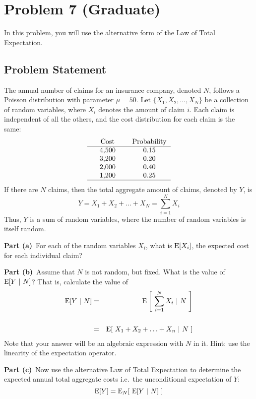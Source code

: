 \documentclass[12pt]{article}
\theoremstyle{definition}
\begin{document}
\newpage
\section*{Problem 7 (Graduate)}

In this problem, you will use the alternative form of the Law of Total Expectation.

\subsection*{Problem Statement}

The annual number of claims for an insurance company, denoted $N$, follows a Poisson distribution with parameter $\mu = 50$. Let $\{X_1, X_2, \ldots, X_N\}$ be a collection of random variables, where $X_i$ denotes the amount of claim $i$. Each claim is independent of all the others, and the cost distribution for each claim is the same:
$$
\begin{tabular}{ccccc}
& Cost & & Probability\\
\hline
& 4,500 & & 0.15\\
& 3,200 & & 0.20\\
& 2,000 & & 0.40\\
& 1,200 & & 0.25\\
\hline
\end{tabular}
$$
If there are $N$ claims, then the total aggregate amount of claims, denoted by $Y$, is
$$
Y = X_1 + X_2 + \ldots + X_N = \sum_{i=1}^N X_i
$$
Thus, $Y$ is a sum of random variables, where the number of random variables is itself random.

\bigskip
\noindent
{\bf Part (a)}\ For each of the random variables $X_i$, what is $\hbox{E}[X_i]$, the expected cost for each individual claim?

\bigskip
\noindent
{\bf Part (b)}\ Assume that $N$ is not random, but fixed. What is the value of $\hbox{E}[Y\ |\ N]$? That is, calculate the value of 
\begin{eqnarray*}
\hbox{E}[ Y\ |\ N] & = & \hbox{E} \left [\ \sum_{i=1}^N X_i\ |\ N\ \right ]\\
\\
& = & \hbox{E}[\ X_1 + X_2 + \ldots + X_n\ |\ N\ ]
\end{eqnarray*}
Note that your answer will be an algebraic expression with $N$ in it. Hint: use the linearity of the expectation operator.

\bigskip
\noindent
{\bf Part (c)}\ Now use the alternative Law of Total Expectation to determine the expected annual total aggregate costs i.e.\ the unconditional expectation of $Y$:
$$
\hbox{E}[ Y ] = \hbox{E}_N[\ \hbox{E}[ Y\ |\ N]\ ]
$$
\end{document}
